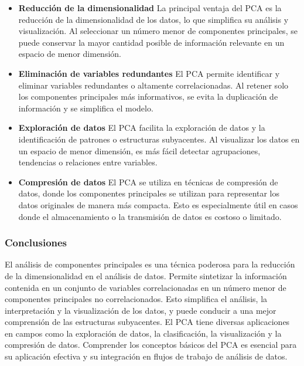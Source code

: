 \documentclass{article}
\begin{document}
\begin{itemize}
\item \textbf{Reducción de la dimensionalidad}
La principal ventaja del PCA es la reducción de la dimensionalidad de los datos, lo que simplifica su análisis y visualización. Al seleccionar un número menor de componentes principales, se puede conservar la mayor cantidad posible de información relevante en un espacio de menor dimensión.

\item \textbf{Eliminación de variables redundantes}
El PCA permite identificar y eliminar variables redundantes o altamente correlacionadas. Al retener solo los componentes principales más informativos, se evita la duplicación de información y se simplifica el modelo.

\item \textbf{Exploración de datos}
El PCA facilita la exploración de datos y la identificación de patrones o estructuras subyacentes. Al visualizar los datos en un espacio de menor dimensión, es más fácil detectar agrupaciones, tendencias o relaciones entre variables.

\item \textbf{Compresión de datos}
El PCA se utiliza en técnicas de compresión de datos, donde los componentes principales se utilizan para representar los datos originales de manera más compacta. Esto es especialmente útil en casos donde el almacenamiento o la transmisión de datos es costoso o limitado.

\end{itemize}

\subsubsection*{Conclusiones}
El análisis de componentes principales es una técnica poderosa para la reducción de la dimensionalidad en el análisis de datos. Permite sintetizar la información contenida en un conjunto de variables correlacionadas en un número menor de componentes principales no correlacionados. Esto simplifica el análisis, la interpretación y la visualización de los datos, y puede conducir a una mejor comprensión de las estructuras subyacentes. El PCA tiene diversas aplicaciones en campos como la exploración de datos, la clasificación, la visualización y la compresión de datos. Comprender los conceptos básicos del PCA es esencial para su aplicación efectiva y su integración en flujos de trabajo de análisis de datos.
\end{document}
